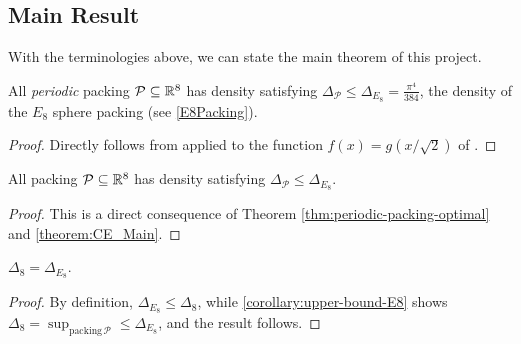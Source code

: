 \subsection{Main Result}

With the terminologies above, we can state the main theorem of this project.

\begin{theorem}\label{theorem:CE_Main}\leanok
  All \emph{periodic} packing $\mathcal{P} \subseteq \mathbb{R}^8$ has density satisfying $\Delta_{\mathcal{P}} \leq \Delta_{E_8} = \frac{\pi^4}{384}$, the density of the $E_8$ sphere packing (see \cref{E8Packing}).
\end{theorem}
\begin{proof}
  Directly follows from  applied to the function $f(x)=g(x/\sqrt{2})$ of .
\end{proof}

\begin{corollary}\label{corollary:upper-bound-E8}\leanok
  All packing $\mathcal{P} \subseteq \mathbb{R}^8$ has density satisfying $\Delta_{\mathcal{P}} \leq \Delta_{E_8}$.
\end{corollary}
\begin{proof}
  This is a direct consequence of Theorem \cref{thm:periodic-packing-optimal} and \cref{theorem:CE_Main}.
\end{proof}

\begin{corollary}\label{MainTheorem}\leanok
  $\Delta_8 = \Delta_{E_8}$.
\end{corollary}
\begin{proof}
  By definition, $\Delta_{E_8} \leq \Delta_8$, while \cref{corollary:upper-bound-E8} shows $\Delta_8 = \sup_{\mathrm{packing} \, \mathcal{P}} \leq \Delta_{E_8}$, and the result follows.
\end{proof}
